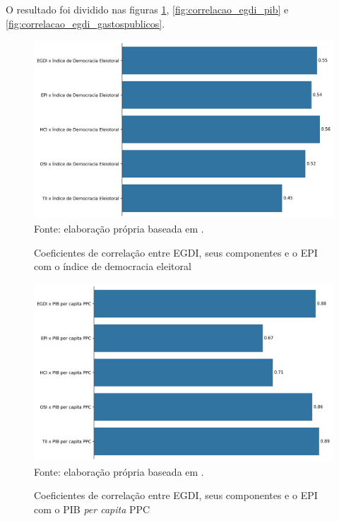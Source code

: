 O resultado foi dividido nas figuras \ref{fig:correlacao_egdi_indicedemocraciaeleitoral}, \ref{fig:correlacao_egdi_pib} e \ref{fig:correlacao_egdi_gastospublicos}.

\begin{figure}[H]
	\centering
	\caption{Coeficientes de correlação entre EGDI, seus componentes e o EPI com o índice de democracia eleitoral}
	\includegraphics[width=1\linewidth]{figuras/correlacao_egdi_indicedemocraciaeleitoral.png}
	\label{fig:correlacao_egdi_indicedemocraciaeleitoral}
	\footnotesize{Fonte: elaboração própria baseada em \cite{electoral-democracy-index}.}
\end{figure}

\begin{figure}[H]
	\centering
	\caption{Coeficientes de correlação entre EGDI, seus componentes e o EPI com o PIB \textit{per capita} PPC}
	\includegraphics[width=1\linewidth]{figuras/correlacao_egdi_pibpercapitapcc.png}
	\label{fig:correlacao_egdi_pibpercapitapcc}
	\footnotesize{Fonte: elaboração própria baseada em \cite{WB_pib_per_capita_países}.}
\end{figure}

